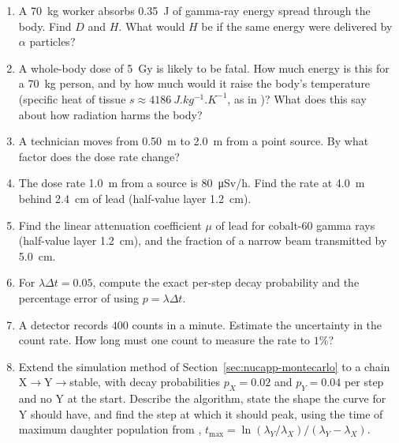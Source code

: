 \begin{enumerate}[itemsep=3pt]
\item\label{pp:nucapp-gamma70} A \SI{70}{kg} worker absorbs \SI{0.35}{J} of gamma-ray energy spread through
      the body. Find $D$ and $H$. What would $H$ be if the same energy were delivered by $\alpha$ particles?
\item\label{pp:nucapp-lethal} A whole-body dose of \SI{5}{\gray} is likely to be fatal. How much energy is this
      for a \SI{70}{kg} person, and by how much would it raise the body's temperature (specific heat of tissue
      $s\approx\SI{4186}{J.kg^{-1}.K^{-1}}$, as in )? What does this say about how radiation
      harms the body?
\item\label{pp:nucapp-invsq} A technician moves from \SI{0.50}{m} to \SI{2.0}{m} from a point source. By what
      factor does the dose rate change?
\item\label{pp:nucapp-worker} The dose rate \SI{1.0}{m} from a source is \SI{80}{\micro\sievert/h}. Find the
      rate at \SI{4.0}{m} behind \SI{2.4}{cm} of lead (half-value layer \SI{1.2}{cm}).
\item\label{pp:nucapp-mu} Find the linear attenuation coefficient $\mu$ of lead for cobalt-60 gamma rays
      (half-value layer \SI{1.2}{cm}), and the fraction of a narrow beam transmitted by \SI{5.0}{cm}.
\item\label{pp:nucapp-pexact} For $\lambda\Delta t=0.05$, compute the exact per-step decay probability and the
      percentage error of using $p=\lambda\Delta t$.
\item\label{pp:nucapp-count} A detector records $400$ counts in a minute. Estimate the uncertainty in the count
      rate. How long must one count to measure the rate to $1\%$?
\item\label{pp:nucapp-chainsim} Extend the simulation method of Section~\ref{sec:nucapp-montecarlo} to a chain
      $\mathrm X\to\mathrm Y\to{}$stable, with decay probabilities $p_X=0.02$ and $p_Y=0.04$ per step and no Y at
      the start. Describe the algorithm, state the shape the curve for Y should have, and find the step at
      which it should peak, using the time of maximum daughter population from ,
      $t_{\max}=\ln(\lambda_Y/\lambda_X)/(\lambda_Y-\lambda_X)$.
\end{enumerate}

